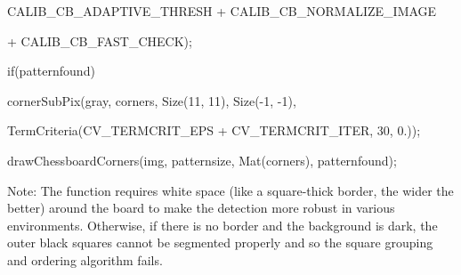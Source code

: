 {\ttfamily C\+A\+L\+I\+B\+\_\+\+C\+B\+\_\+\+A\+D\+A\+P\+T\+I\+V\+E\+\_\+\+T\+H\+R\+E\+SH + C\+A\+L\+I\+B\+\_\+\+C\+B\+\_\+\+N\+O\+R\+M\+A\+L\+I\+Z\+E\+\_\+\+I\+M\+A\+GE}

{\ttfamily }

{\ttfamily }

{\ttfamily + C\+A\+L\+I\+B\+\_\+\+C\+B\+\_\+\+F\+A\+S\+T\+\_\+\+C\+H\+E\+CK);}

{\ttfamily }

{\ttfamily }

{\ttfamily if(patternfound)}

{\ttfamily }

{\ttfamily }

{\ttfamily corner\+Sub\+Pix(gray, corners, Size(11, 11), Size(-\/1, -\/1),}

{\ttfamily }

{\ttfamily }

{\ttfamily Term\+Criteria(C\+V\+\_\+\+T\+E\+R\+M\+C\+R\+I\+T\+\_\+\+E\+PS + C\+V\+\_\+\+T\+E\+R\+M\+C\+R\+I\+T\+\_\+\+I\+T\+ER, 30, 0.));}

{\ttfamily }

{\ttfamily }

{\ttfamily draw\+Chessboard\+Corners(img, patternsize, Mat(corners), patternfound);}

{\ttfamily }

{\ttfamily }

{\ttfamily Note\+: The function requires white space (like a square-\/thick border, the wider the better) around the board to make the detection more robust in various environments. Otherwise, if there is no border and the background is dark, the outer black squares cannot be segmented properly and so the square grouping and ordering algorithm fails. }


